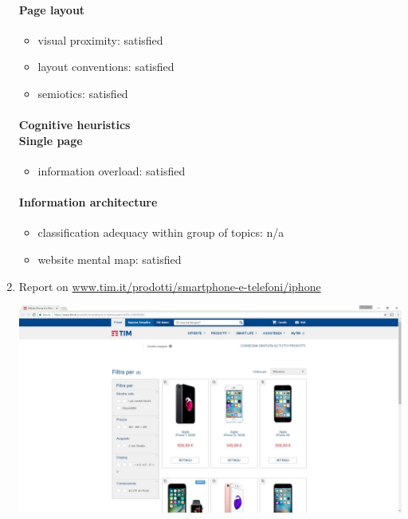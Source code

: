\begin{enumerate}
	\paragraph*{Page layout}
	\begin{itemize}
		\item visual proximity: satisfied
		\item layout conventions: satisfied
		\item semiotics: satisfied
	\end{itemize}	
	
	\paragraph*{Cognitive heuristics \\ Single page}
	\begin{itemize}
		\item information overload: satisfied
	\end{itemize}	
	
	\paragraph*{Information architecture}
	\begin{itemize}
		\item classification adequacy within group of topics: n/a
		\item website mental map: satisfied
	\end{itemize}


\item Report on \url{www.tim.it/prodotti/smartphone-e-telefoni/iphone}

\begin{center}
	\includegraphics[width=\textwidth]{Screenshot/iphone.jpg}
\end{center}
\vspace{1cm}


\end{enumerate}
